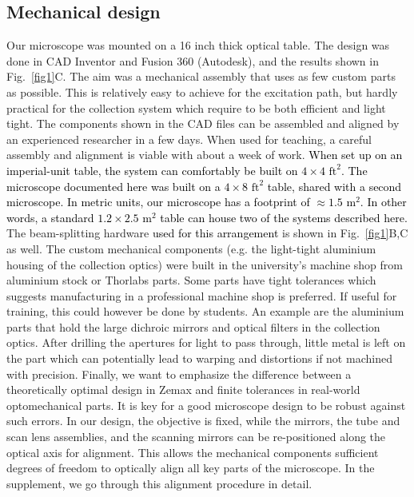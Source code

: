 \documentclass[10pt,letterpaper]{article}
\begin{document}
\subsection*{Mechanical design}
Our microscope was mounted on a 16 inch thick optical table. The design was done in CAD Inventor and Fusion 360 (Autodesk), and the results shown in Fig.~\ref{fig1}C. The aim was a mechanical assembly that uses as few custom parts as possible. This is relatively easy to achieve for the excitation path, but hardly practical for the collection system which require to be both efficient and light tight. The components shown in the CAD files can be assembled and aligned by an experienced researcher in a few days. When used for teaching, a careful assembly and alignment is viable with about a week of work. \textcolor{black}{When set up on an imperial-unit table, the system can comfortably be built on $4\times4 \text{ ft}^2$. The microscope documented here was built on a $4\times8\text{ ft}^2$ table, shared with a second microscope. In metric units, our microscope has a footprint of $\approx 1.5\text{ m}^2$. In other words, a standard $1.2\times2.5\text{ m}^2$ table can house two of the systems described here.} The beam-splitting hardware \textcolor{black}{used for this arrangement} is shown in Fig.~\ref{fig1}B,C as well.\newline
The custom mechanical components (e.g. the light-tight aluminium housing of the collection optics) were built in the university's machine shop from aluminium stock or Thorlabs parts. Some parts have tight tolerances which suggests manufacturing in a professional machine shop is preferred. If useful for training, this could however be done by students. An example are the aluminium parts that hold the large dichroic mirrors and optical filters in the collection optics. After drilling the apertures for light to pass through, little metal is left on the part which can potentially lead to warping and distortions if not machined with precision.\newline
Finally, we want to emphasize the difference between a theoretically optimal design in Zemax and finite tolerances in real-world optomechanical parts. It is key for a good microscope design to be robust against such errors. In our design, the objective is fixed, while the mirrors, the tube and scan lens assemblies, and the scanning mirrors can be re-positioned along the optical axis for alignment. This allows the mechanical components sufficient degrees of freedom to optically align all key parts of the microscope. In the supplement, we go through this alignment procedure in detail.
\end{document}
